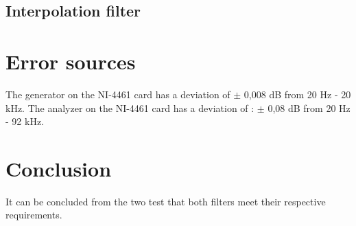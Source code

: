 \subsection*{Interpolation filter}



\section{Error sources}
The generator on the NI-4461 card has a deviation of $\pm$ 0,008 dB from 20 Hz - 20 kHz. The analyzer on the NI-4461 card has a deviation of : $\pm$ 0,08 dB from 20 Hz - 92 kHz. 

\section{Conclusion}
It can be concluded from the two test that both filters meet their respective requirements.
